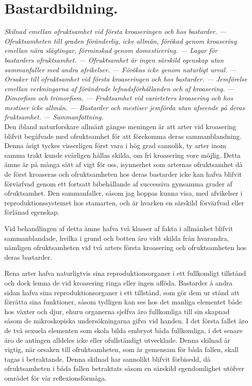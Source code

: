 




\chapter{Bastardbildning.}

{\it
Skilnad emellan ofruktsamhet vid första kroaseringen och hos bastarder. — Ofruktsamheten till graden föränderlig, icke allmän, förökad genom kroasering emellan nära slägtingar, förminskad genom domesticering. — Lagar för bastarders ofruktsamhet. — Ofruktsamhet är ingen särskild egenskap utan sammanfaller med andra afvikelser. — Förökas icke genom naturligt urval. — Orsaker till ofruktsamhet vid första kroaseringen och hos bastarder. — Jemförelse emellan verkningarna af förändrade lefnadsförhållanden och af kroasering. — Dimorfism och trimorfism. — Fruktsamhet vid varieteters kroasering och hos mestiser icke allmän. — Bastarder och mestiser jemförda utan afseende på deras fruktsamhet. — Sammanfattning.
}\\[0.5cm]

Den ibland naturforskare allmänt gängse meningen är att arter vid kroasering blifvit begåfvade med ofruktsamhet för att förekomma deras sammanblandning. Denna åsigt tyckes visserligen först vara i hög grad sannolik, ty arter inom samma trakt kunde svårligen hållas skilda, om fri kroasering vore möjlig. Detta ämne är på många sätt af vigt för oss, isynnerhet som arternas ofruktsamhet då de först kroaseras och ofruktsamheten hos deras bastarder icke kan hafva blifvit förvärfvad genom ett fortsatt bibehållande af successiva gynsamma grader af ofruktsamhet. Den sammanfaller, såsom jag hoppas kunna visa, med afvikelser i reproduktionssystemet hos stamarten, och är hvarken en särskild förvärfvad eller förlänad egenskap.

Vid behandlingen af detta ämne hafva två klasser af fakta i allmänhet blifvit sammanblandade, hvilka i grund och botten äro vidt skilda från hvarandra, nämligen ofruktsamheten vid två arters första kroasering och ofruktsamheten hos deras bastarder.

Rena arter hafva naturligtvis sina reproduktionsorganer i ett fullkomligt tillstånd och dock lemna de vid kroasering ringa eller ingen afföda. Bastarder å andra sidan hafva sina reproduktionsorganer i ett tillstånd, som gör dem ur stånd att förrätta sina funktioner, såsom tydligen kan ses hos det manliga elementet både hos växter och djur, ehuru organerna sjelfva äro fullkomliga till sin skapnad såsom de mikroskopiska undersökningarna gifva vid handen. I det första fallet äro de två sexuela elementen som skola bilda embryot båda fullkomliga, i det senare äro de antingen alldeles icke eller ofullständigt utvecklade. Denna skilnad är vigtig, när orsaken till ofruktsamheten, som är gemensam för båda fallen, skall tagas i betraktande. Denna skilnad har sannolikt blifvit förbisedd, då ofruktsamheten i båda fallen betraktats såsom en särskild egendomlighet utöfver området för vår reflexionsförmåga.

